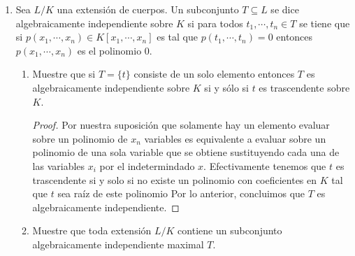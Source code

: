 \documentclass[letter,twoside,12pt]{article}
\begin{document}
\begin{enumerate}
\begin{enumerate}
\begin{proof}
Ahora también tenemos que $ K(\mu_1,\mu_1+\mu_2) = K(\mu_2,\mu_1+\mu_2) = K(\mu_1,\mu_2) $. Valiendonos de nuevo del lema de torres tenemos que $ p_1p_2=[K(\mu_1,\mu_1+\mu_2):K]=[K(\mu_1,\mu_1+\mu_2):K(\mu_1+\mu_2)][K(\mu_1+\mu_2:K] $ y $ p_1p_2 = [K(\mu_2,\mu_1+\mu_2):K]=[K(\mu_1,\mu_1+\mu_2):K(\mu_1+\mu_2)][K(\mu_1+\mu_2:K] $. Ahora $ [K(\mu_1,\mu_1+\mu_2):K(\mu_1+\mu_2)] $ puede ser 1 o $ p_2 $ dependiendo de sí $ \mu_1 $ esta contenido o no y de igual manera con $ [K(\mu_2,\mu_1+\mu_2):K(\mu_1+\mu_2)] $. Si alguno de estos es 1 entonces concluiriamos por el lema de las torres que  $ [K(\mu_1+\mu_2):K]=p_1p_2 $, pero si suponemos que ninguno de los 2 es 1 llegariamos rapidamente a una contradicción porque el lema de las torres nos permitiria concluir que $ [K(\mu_1+\mu_2):K] = p_1 $ y $ [K(\mu_1+\mu_2):K] = p_2 $ al mismo tiempo. Luego $ [K(\mu_1+\mu_2):K] = p_1p_2 $
\end{proof}
\end{enumerate}

\item Sea $ L/K $ una extensión de cuerpos. Un subconjunto $ T \subseteq L $ se dice algebraicamente independiente sobre
$ K $ si para todos $ t_1,\cdots , t_n \in T $ se tiene que si $ p(x_1,\cdots, x_n) \in K[x_1, \cdots, x_n] $ es tal que $ p(t_1, \cdots , t_n) = 0 $ entonces $ p(x_1,\cdots, x_n) $ es el polinomio 0.

\begin{enumerate}
\item Muestre que si $ T = \{t\} $ consiste de un solo elemento entonces $ T $ es algebraicamente independiente
sobre $ K $ si y sólo si $ t $ es trascendente sobre $ K $.
\begin{proof}
Por nuestra suposición que solamente hay un elemento evaluar sobre un polinomio de $ x_n $ variables es equivalente a evaluar sobre un polinomio de una sola variable que se obtiene sustituyendo cada una de las variables $ x_i $ por el indetermindado $ x $. Efectivamente tenemos que $ t $ es trascendente si y solo si no existe un polinomio con coeficientes en $ K $ tal que $ t $ sea raíz de este polinomio Por lo anterior, concluimos que $ T $ es algebraicamente independiente.  
\end{proof}
\item  Muestre que toda extensión $ L/K $ contiene un subconjunto algebraicamente independiente maximal $ T $.


\end{enumerate}
\end{enumerate}
\end{document}
